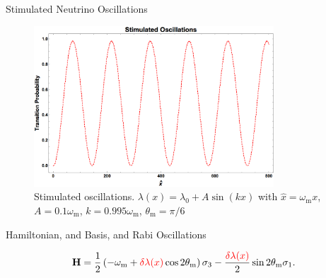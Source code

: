 \documentclass[9pt]{beamer}
\begin{document}
\begin{darkframes}
\begin{frame}{Stimulated Neutrino Oscillations}
{\begin{figure}
\includegraphics[width=0.8\textwidth]{assets/stimulated-oscillation-phenomenon.png}
\caption*{Stimulated oscillations. $\lambda(x) = \lambda_0 +  A \sin (k x)$  with $\hat x = \omega_{\mathrm m} x $, $A=0.1\omega_{\mathrm m}$, $k=0.995\omega_{\mathrm m}$, $\theta_{\mathrm{m}}=\pi/6$}
\end{figure}


}





\end{frame}






















\begin{frame}{Hamiltonian, and Basis, and Rabi Oscillations}



\begin{tcolorbox}[title=Hamiltonian in Background Matter Basis]
    \begin{equation*}
    \mathbf {H} = \frac{1}{2}\left( - \omega_{\mathrm{m}} + {\color{red}\delta \lambda(x)} \cos 2\theta_{\mathrm{m}} \right) \sigma_3 - \frac{  {\color{red}\delta \lambda(x)}  }{2} \sin 2\theta_{\mathrm{m}} \sigma_1.
\end{equation*}
\end{tcolorbox}



\end{frame}
\end{darkframes}
\end{document}
